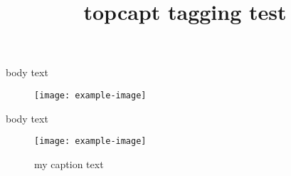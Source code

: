 \documentclass{article}
\title{topcapt tagging test}
\begin{document}
body text
\begin{figure}
\texttt{[image: example-image]}
\end{figure}

body text
\begin{figure}
\texttt{[image: example-image]}
\caption{my caption text}
\end{figure}
\end{document}
